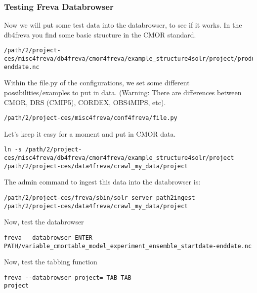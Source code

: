 \documentclass[a4paper,11pt]{ltxdoc}
\begin{document}
\subsubsection{Testing Freva Databrowser}
Now we will put some test data into the databrowser, to see if it works. In the db4freva you find some basic structure in the CMOR standard.
\begin{lstlisting}
/path/2/project-ces/misc4freva/db4freva/cmor4freva/example_structure4solr/project/product/institute/model/experiment/time_frequency/realm/ensemble/variable_cmortable_model_experiment_ensemble_startdate-enddate.nc \end{lstlisting}
Within the file.py of the configurations, we set some different possibilities/examples to put in data. (Warning: There are differences between CMOR, DRS (CMIP5), CORDEX, OBS4MIPS, etc).
\begin{lstlisting}
/path/2/project-ces/misc4freva/conf4freva/file.py\end{lstlisting}
Let's keep it easy for a moment and put in CMOR data.
\begin{lstlisting}
ln -s /path/2/project-ces/misc4freva/db4freva/cmor4freva/example_structure4solr/project /path/2/project-ces/data4freva/crawl_my_data/project \end{lstlisting}
The admin command to ingest this data into the databrowser is:
\begin{lstlisting}
/path/2/project-ces/freva/sbin/solr_server path2ingest /path/2/project-ces/data4freva/crawl_my_data/project\end{lstlisting}
Now, test the databrowser 
\begin{lstlisting}
freva --databrowser ENTER
PATH/variable_cmortable_model_experiment_ensemble_startdate-enddate.nc\end{lstlisting}
Now, test the tabbing function
\begin{lstlisting}
freva --databrowser project= TAB TAB
project\end{lstlisting}
\end{document}

